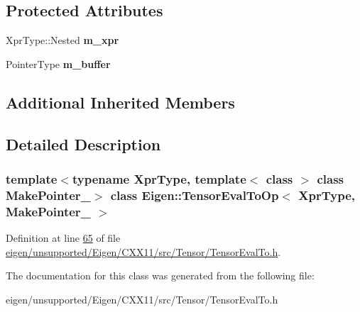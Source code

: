 \subsection*{Protected Attributes}
\begin{DoxyCompactItemize}
\item 
\mbox{\label{class_eigen_1_1_tensor_eval_to_op_a13c4d636d03dcb2980da14545f719bea}} 
Xpr\+Type\+::\+Nested {\bfseries m\+\_\+xpr}
\item 
\mbox{\label{class_eigen_1_1_tensor_eval_to_op_a9c0db4e7ec94ade7427cce553077fc21}} 
Pointer\+Type {\bfseries m\+\_\+buffer}
\end{DoxyCompactItemize}
\subsection*{Additional Inherited Members}


\subsection{Detailed Description}
\subsubsection*{template$<$typename Xpr\+Type, template$<$ class $>$ class Make\+Pointer\+\_\+$>$\newline
class Eigen\+::\+Tensor\+Eval\+To\+Op$<$ Xpr\+Type, Make\+Pointer\+\_\+ $>$}



Definition at line \hyperlink{eigen_2unsupported_2_eigen_2_c_x_x11_2src_2_tensor_2_tensor_eval_to_8h_source_l00065}{65} of file \hyperlink{eigen_2unsupported_2_eigen_2_c_x_x11_2src_2_tensor_2_tensor_eval_to_8h_source}{eigen/unsupported/\+Eigen/\+C\+X\+X11/src/\+Tensor/\+Tensor\+Eval\+To.\+h}.



The documentation for this class was generated from the following file\+:\begin{DoxyCompactItemize}
\item 
eigen/unsupported/\+Eigen/\+C\+X\+X11/src/\+Tensor/\+Tensor\+Eval\+To.\+h\end{DoxyCompactItemize}
